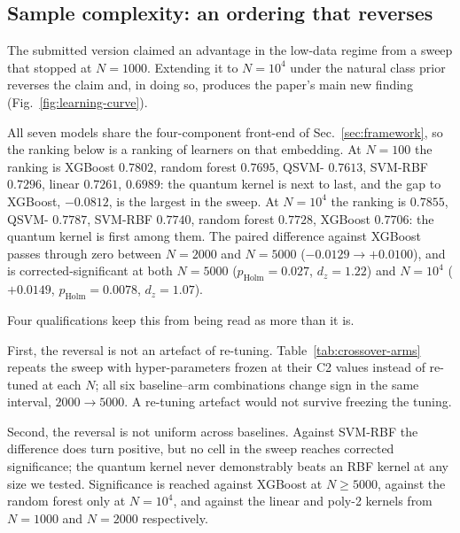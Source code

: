 \subsection{Sample complexity: an ordering that reverses}
\label{sec:res-c4}



\begin{revbody}



The submitted version claimed an advantage in the low-data regime from a sweep
that stopped at $N=1000$. Extending it to $N=10^4$ under the natural class prior
reverses the claim and, in doing so, produces the paper's main new finding
(Fig.~\ref{fig:learning-curve}).

All seven models share the four-component front-end of
Sec.~\ref{sec:framework}, so the ranking below is a ranking of learners on
that embedding. At $N=100$ the ranking is XGBoost $0.7802$, random forest $0.7695$,
QSVM-\Zmap{} $0.7613$, SVM-RBF $0.7296$, linear $0.7261$, \QSVM{} $0.6989$: the
quantum kernel is next to last, and the gap to XGBoost, $-0.0812$, is the
largest in the sweep. At $N=10^4$ the ranking is \QSVM{} $0.7855$, QSVM-\Zmap{}
$0.7787$, SVM-RBF $0.7740$, random forest $0.7728$, XGBoost $0.7706$: the
quantum kernel is first among them. The paired difference against XGBoost passes through
zero between $N=2000$ and $N=5000$ ($-0.0129 \rightarrow +0.0100$), and is
corrected-significant at both $N=5000$ ($p_{\text{Holm}}=0.027$, $d_z=1.22$) and
$N=10^4$ ($+0.0149$, $p_{\text{Holm}}=0.0078$, $d_z=1.07$).

Four qualifications keep this from being read as more than it is.

First, the reversal is not an artefact of re-tuning.
Table~\ref{tab:crossover-arms} repeats the sweep with hyper-parameters frozen at
their C2 values instead of re-tuned at each $N$; all six baseline--arm
combinations change sign in the same interval, $2000\rightarrow5000$. A
re-tuning artefact would not survive freezing the tuning.

Second, the reversal is not uniform across baselines. Against SVM-RBF the
difference does turn positive, but no cell in the sweep reaches
corrected significance; the quantum kernel never demonstrably beats an RBF
kernel at any size we tested. Significance is reached against XGBoost at
$N\geq5000$, against the random forest only at $N=10^4$, and against the linear
and poly-2 kernels from $N=1000$ and $N=2000$ respectively.


\end{revbody}
